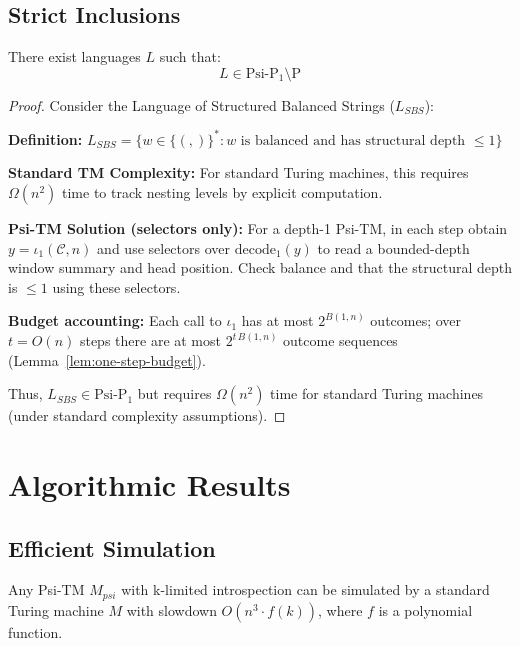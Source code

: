 \subsection{Strict Inclusions}

\begin{theorem}
There exist languages $L$ such that:
$$L \in \text{Psi-P}_1 \setminus \text{P}$$
\end{theorem}

\begin{proof}
Consider the Language of Structured Balanced Strings ($L_{SBS}$):

\textbf{Definition:} $L_{SBS} = \{w \in \{(,)\}^* : w \text{ is balanced and has structural depth } \leq 1\}$

\textbf{Standard TM Complexity:}
For standard Turing machines, this requires $\Omega(n^2)$ time to track nesting levels by explicit computation.

\textbf{Psi-TM Solution (selectors only):}
For a depth-1 Psi-TM, in each step obtain $y=\iota_1(\mathcal{C},n)$ and use selectors over $\mathrm{decode}_1(y)$ to read a bounded-depth window summary and head position. Check balance and that the structural depth is $\le 1$ using these selectors.

\textbf{Budget accounting:}
Each call to $\iota_1$ has at most $2^{B(1,n)}$ outcomes; over $t=O(n)$ steps there are at most $2^{t\,B(1,n)}$ outcome sequences (Lemma~\ref{lem:one-step-budget}).

Thus, $L_{SBS} \in \text{Psi-P}_1$ but requires $\Omega(n^2)$ time for standard Turing machines (under standard complexity assumptions).
\end{proof}

\section{Algorithmic Results}

\subsection{Efficient Simulation}

\begin{theorem}
Any Psi-TM $M_{psi}$ with k-limited introspection can be simulated by a standard Turing machine $M$ with slowdown $O(n^3 \cdot f(k))$, where $f$ is a polynomial function.
\end{theorem}

